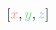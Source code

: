\documentclass[preview]{standalone}
\begin{document}
$\left[\textcolor[HTML]{f59789}{x}, \textcolor[HTML]{7dc98c}{y}, \textcolor[HTML]{96b1fe}{z}\right]$
\end{document}

